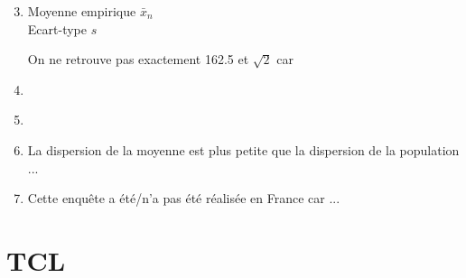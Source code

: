 \documentclass{article}
\begin{document}
\begin{enumerate}
    \setcounter{enumi}{2}
    \item
        \begin{figure}[h!] %
            \centering
        \end{figure}
        
        \begin{description}
            \item[Moyenne empirique $\bar{x}_{n}$] 
            \item[Ecart-type $s$]
        \end{description}
        On ne retrouve pas exactement 162.5 et $\sqrt{2}$ car 
        
        
    \item %
        \begin{lstlisting}[numbers=none] 
        \end{lstlisting}
        
        
    \item
        \begin{figure}[h!] %
        \centering
        \end{figure}
    
    
    \item La dispersion de la moyenne est plus petite que la dispersion de la population ...
    
    
    
    \item Cette enquête a été/n'a pas été réalisée en France car ...
    
\end{enumerate}

\newpage
\section{TCL}
\end{document}
